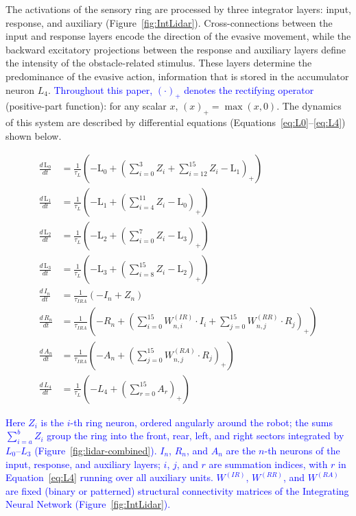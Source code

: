 \documentclass[preprint,12pt]{elsarticle}
\newcommand{\revblue}[1]{\textcolor{blue}{#1}}
\begin{document}
The activations of the sensory ring are processed by three integrator layers: input, response, and auxiliary (Figure~\ref{fig:IntLidar}). Cross-connections between the input and response layers encode the direction of the evasive movement, while the backward excitatory projections between the response and auxiliary layers define the intensity of the obstacle-related stimulus. These layers determine the predominance of the evasive action, information that is stored in the accumulator neuron $L_4$. \revblue{Throughout this paper, $(\cdot)_+$ denotes the rectifying operator} (positive-part function): for any scalar $x$, $(x)_+ = \max(x,0)$. The dynamics of this system are described by differential equations (Equations~\eqref{eq:L0}--\eqref{eq:L4}) shown below. 

\begin{align}
\frac{d\, \text{L}_0}{dt} &= \frac{1}{\tau_{L}} \left( -\text{L}_0 + \left( \sum_{i=0}^{3} Z_i + \sum_{i=12}^{15} Z_i - \text{L}_1 \right)_+ \right)\label{eq:L0}\\
\frac{d\, \text{L}_1}{dt} &= \frac{1}{\tau_{L}} \left( -\text{L}_1 + \left( \sum_{i=4}^{11} Z_i - \text{L}_0 \right)_+ \right)\label{eq:L1}\\
\frac{d\, \text{L}_2}{dt} &= \frac{1}{\tau_{L}} \left( -\text{L}_2 + \left( \sum_{i=0}^{7} Z_i - \text{L}_3 \right)_+ \right)\label{eq:L2}\\
\frac{d\, \text{L}_3}{dt} &= \frac{1}{\tau_{L}} \left( -\text{L}_3 + \left( \sum_{i=8}^{15} Z_i - \text{L}_2 \right)_+ \right)\label{eq:L3}\\
\frac{d\, I_n}{dt} &= \frac{1}{\tau_{IRA}} \left( -I_n + Z_n \right)\label{eq:InputL}\\
\frac{d\, R_n}{dt} &= \frac{1}{\tau_{IRA}} \left( -R_n + \left(\sum_{i=0}^{15} W^{(IR)}_{n,i} \cdot I_i + \sum_{j=0}^{15} W^{(RR)}_{n,j} \cdot R_j \right)_+\right)\label{eq:ResL}\\
\frac{d\, A_n}{dt} &= \frac{1}{\tau_{IRA}} \left( -A_n + \left(\sum_{j=0}^{15} W^{(RA)}_{n,j} \cdot R_j \right)_+ \right)\label{eq:AuxL}\\
\frac{d\, L_4}{dt} &= \frac{1}{\tau_L} \left( -L_4 + \left(\sum_{r=0}^{15} A_r \right) _+\right)\label{eq:L4}
\end{align}

\revblue{Here $Z_i$ is the $i$-th ring neuron, ordered angularly around the robot; the sums $\sum_{i=a}^{b} Z_i$ group the ring into the front, rear, left, and right sectors integrated by $L_0$--$L_3$ (Figure~\ref{fig:lidar-combined}). $I_n$, $R_n$, and $A_n$ are the $n$-th neurons of the input, response, and auxiliary layers; $i$, $j$, and $r$ are summation indices, with $r$ in Equation~\eqref{eq:L4} running over all auxiliary units. $W^{(IR)}$, $W^{(RR)}$, and $W^{(RA)}$ are fixed (binary or patterned) structural connectivity matrices of the Integrating Neural Network (Figure~\ref{fig:IntLidar}).}
\end{document}
